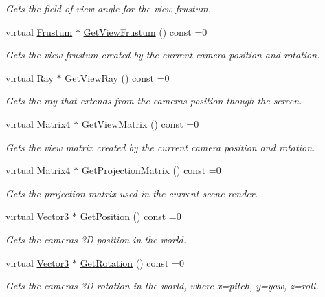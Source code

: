 \begin{DoxyCompactItemize}
\begin{DoxyCompactList}\small\item\em Gets the field of view angle for the view frustum. \end{DoxyCompactList}\item 
virtual \hyperlink{class_flounder_1_1_frustum}{Frustum} $\ast$ \hyperlink{class_flounder_1_1_i_camera_a04001eaff8a7b5c24683ea29f52ead02}{Get\+View\+Frustum} () const =0
\begin{DoxyCompactList}\small\item\em Gets the view frustum created by the current camera position and rotation. \end{DoxyCompactList}\item 
virtual \hyperlink{class_flounder_1_1_ray}{Ray} $\ast$ \hyperlink{class_flounder_1_1_i_camera_a28bd4870a68a234e8f188229387625c7}{Get\+View\+Ray} () const =0
\begin{DoxyCompactList}\small\item\em Gets the ray that extends from the cameras position though the screen. \end{DoxyCompactList}\item 
virtual \hyperlink{class_flounder_1_1_matrix4}{Matrix4} $\ast$ \hyperlink{class_flounder_1_1_i_camera_a959df8b3c98c82dc428dcf26b4650913}{Get\+View\+Matrix} () const =0
\begin{DoxyCompactList}\small\item\em Gets the view matrix created by the current camera position and rotation. \end{DoxyCompactList}\item 
virtual \hyperlink{class_flounder_1_1_matrix4}{Matrix4} $\ast$ \hyperlink{class_flounder_1_1_i_camera_a1cb26d06f1334e892e418bd72d317280}{Get\+Projection\+Matrix} () const =0
\begin{DoxyCompactList}\small\item\em Gets the projection matrix used in the current scene render. \end{DoxyCompactList}\item 
virtual \hyperlink{class_flounder_1_1_vector3}{Vector3} $\ast$ \hyperlink{class_flounder_1_1_i_camera_ad28eeed8a4c9c53138c257242f423a28}{Get\+Position} () const =0
\begin{DoxyCompactList}\small\item\em Gets the cameras 3D position in the world. \end{DoxyCompactList}\item 
virtual \hyperlink{class_flounder_1_1_vector3}{Vector3} $\ast$ \hyperlink{class_flounder_1_1_i_camera_ae2f71137c1450aae224755aa27ddbfe2}{Get\+Rotation} () const =0
\begin{DoxyCompactList}\small\item\em Gets the cameras 3D rotation in the world, where x=pitch, y=yaw, z=roll. \end{DoxyCompactList}\end{DoxyCompactItemize}


